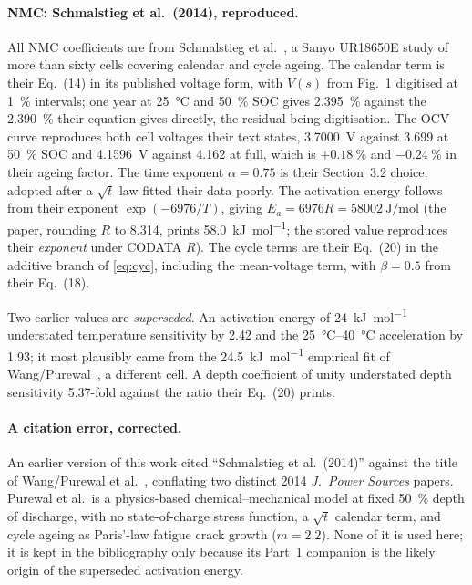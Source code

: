 \documentclass[11pt,a4paper]{article}
\begin{document}
\paragraph{NMC: Schmalstieg et al.\ (2014), reproduced.}
All NMC coefficients are from Schmalstieg et al.~\cite{schmalstieg2014},
a Sanyo UR18650E study of more than sixty cells covering calendar and
cycle ageing. The calendar term is their Eq.~(14) in its published
voltage form, with $V(s)$ from Fig.~1 digitised at \SI{1}{\percent}
intervals; one year at \SI{25}{\celsius} and \SI{50}{\percent} SOC
gives \SI{2.395}{\percent} against the \SI{2.390}{\percent} their
equation gives directly, the residual being digitisation. The OCV curve
reproduces both cell voltages their text states, \SI{3.7000}{\volt}
against \num{3.699} at \SI{50}{\percent} SOC and \SI{4.1596}{\volt}
against \num{4.162} at full, which is $+\SI{0.18}{\percent}$ and
$-\SI{0.24}{\percent}$ in their ageing factor. The time exponent
$\alpha = 0.75$ is their Section~3.2 choice, adopted after a $\sqrt{t}$
law fitted their data poorly. The activation energy follows from their
exponent $\exp(-6976/T)$, giving
$E_a = 6976R = \SI{58002}{\joule\per\mole}$ (the paper, rounding $R$ to \num{8.314}, prints \SI{58.0}{\kilo\joule\per\mole}; the stored value reproduces their \emph{exponent} under CODATA $R$). The cycle terms are
their Eq.~(20) in the additive branch of \eqref{eq:cyc}, including the
mean-voltage term, with $\beta = 0.5$ from their Eq.~(18).

Two earlier values are \emph{superseded}. An activation energy of
\SI{24}{\kilo\joule\per\mole} understated temperature sensitivity by
\num{2.42} and the \SIrange{25}{40}{\celsius} acceleration by
\num{1.93}; it most plausibly came from the
\SI{24.5}{\kilo\joule\per\mole} empirical fit of
Wang/Purewal~\cite{wang2014}, a different cell. A depth coefficient of
unity understated depth sensitivity \num{5.37}-fold against the ratio
their Eq.~(20) prints.

\paragraph{A citation error, corrected.}
An earlier version of this work cited ``Schmalstieg et al.\ (2014)''
against the title of Wang/Purewal et al.~\cite{wang2014,purewal2014},
conflating two distinct 2014 \emph{J.\ Power Sources} papers. Purewal
et al.\ is a physics-based chemical--mechanical model at fixed
\SI{50}{\percent} depth of discharge, with no state-of-charge stress
function, a $\sqrt{t}$ calendar term, and cycle ageing as Paris'-law
fatigue crack growth ($m = 2.2$). None of it is used here; it is kept
in the bibliography only because its Part~1 companion is the likely
origin of the superseded activation energy.
\end{document}
